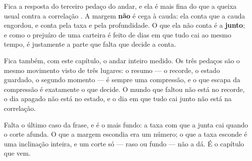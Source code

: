 Fica a resposta do terceiro pedaço do andar, e ela é mais fina do que a queixa usual contra a
correlação \cite{koike2026measuring}. A margem \textbf{não} é cega à cauda: ela conta que a cauda engordou, e conta pela taxa e pela
profundidade. O que ela não conta é a \textbf{junto}; e como o prejuízo de uma carteira é feito de dias em
que tudo cai ao mesmo tempo, é justamente a parte que falta que decide a conta.

Fica também, com este capítulo, o andar inteiro medido. Os três pedaços são o mesmo movimento visto
de três lugares: o resumo --- o recorde, o estado guardado, o segundo momento --- é sempre uma
compressão, e o que escapa da compressão é exatamente o que decide. O mundo que faltou não está no
recorde, o dia apagado não está no estado, e o dia em que tudo cai junto não está na correlação.

Falta o último caso da frase, e é o mais fundo: a taxa com que a junta cai quando o corte afunda. O
que a margem escondia era um número; o que a taxa esconde é uma inclinação inteira, e um corte só ---
raso ou fundo --- não a dá. É o capítulo que vem.
